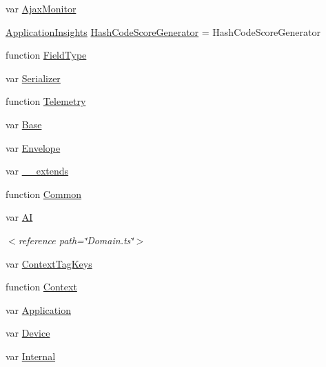 \begin{DoxyCompactItemize}
\item 
var \hyperlink{_scripts_2ai_80_822_89-build00167_8js_a04e5b115a114a7180491d402b8c7e51b}{Ajax\+Monitor}
\item 
\hyperlink{_scripts_2ai_80_822_89-build00167_8js_aa415ef4f8cdd699689ef4b61db7656d8}{Application\+Insights} \hyperlink{_scripts_2ai_80_822_89-build00167_8js_a1712decfcea3323f71212ee873c74ce2}{Hash\+Code\+Score\+Generator} = Hash\+Code\+Score\+Generator
\item 
function \hyperlink{_scripts_2ai_80_822_89-build00167_8js_a21475a2b33a5a873fc477ad4b7f274d7}{Field\+Type}
\item 
var \hyperlink{_scripts_2ai_80_822_89-build00167_8js_ad312dca62ea45e4d0019b9fe66329a92}{Serializer}
\item 
function \hyperlink{_scripts_2ai_80_822_89-build00167_8js_a1c5c71b1345d65757492c301c9df0212}{Telemetry}
\item 
var \hyperlink{_scripts_2ai_80_822_89-build00167_8js_abc90faad356138d0991872b4e65ecf20}{Base}
\item 
var \hyperlink{_scripts_2ai_80_822_89-build00167_8js_a9823f9c23669cb68ab0acbfa8d2180a7}{Envelope}
\item 
var \hyperlink{_scripts_2ai_80_822_89-build00167_8js_ac09f4951ac4b25df0272d4e78ff85ae0}{\+\_\+\+\_\+extends}
\item 
function \hyperlink{_scripts_2ai_80_822_89-build00167_8js_a2898ea5b5bdc6f6ebd68c36327a6cecd}{Common}
\item 
var \hyperlink{_scripts_2ai_80_822_89-build00167_8js_a4c5b13b0856d3a81275166500e19c58b}{AI}
\begin{DoxyCompactList}\small\item\em $<$reference path=\char`\"{}\+Domain.\+ts\char`\"{}$>$ \end{DoxyCompactList}\item 
var \hyperlink{_scripts_2ai_80_822_89-build00167_8js_a72ddf7ed435bb5a0f2826ad1a1f57735}{Context\+Tag\+Keys}
\item 
function \hyperlink{_scripts_2ai_80_822_89-build00167_8js_abbebfae2c8b3c06e3115e79965277840}{Context}
\item 
var \hyperlink{_scripts_2ai_80_822_89-build00167_8js_ad06be159591b6802b5db7e36265c7ed5}{Application}
\item 
var \hyperlink{_scripts_2ai_80_822_89-build00167_8js_a8a8c87708717f319fc6104f268130638}{Device}
\item 
var \hyperlink{_scripts_2ai_80_822_89-build00167_8js_a259cf48ccc03a91135eacb5dbc0cf8b6}{Internal}

\end{DoxyCompactItemize}
